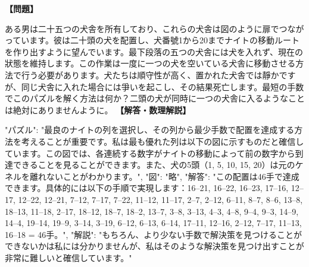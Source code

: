 \documentclass[10pt,a4paper,oneside,openany]{ltjsbook}
\begin{document}
\begin{tcolorbox}[colback=softblue,colframe=primaryblue,title=\textbf{第 344 問：THE KENNEL PUZZLE.},arc=2mm,boxrule=1pt,breakable]
\textbf{【問題】}\par\vspace{0.3em}

ある男は二十五つの犬舎を所有しており、これらの犬舎は図のように扉でつながっています。彼は二十頭の犬を配置し、犬番號1から20までナイトの移動ルートを作り出すように望んでいます。最下段落の五つの犬舎には犬を入れず、現在の狀態を維持します。この作業は一度に一つの犬を空いている犬舎に移動させる方法で行う必要があります。犬たちは順守性が高く、置かれた犬舎では靜かですが、同じ犬舎に入れた場合には爭いを起こし、その結果死亡します。最短の手数でこのパズルを解く方法は何か？二頭の犬が同時に一つの犬舎に入るようなことは絶対にありませんように。
\tcblower
\textbf{【解答・数理解説】}\par\vspace{0.3em}
{
    "パズル": "最良のナイトの列を選択し、その列から最少手数で配置を達成する方法を考えることが重要です。私は最も優れた列は以下の図に示すものだと確信しています。この図では、各連続する数字がナイトの移動によって前の数字から到達できることを見ることができます。また、犬の5頭（1, 5, 10, 15, 20）は元のケネルを離れないことがわかります。",
    "図": "略",
    "解答": "この配置は46手で達成できます。具体的には以下の手順で実現します：16--21, 16--22, 16--23, 17--16, 12--17, 12--22, 12--21, 7--12, 7--17, 7--22, 11--12, 11--17, 2--7, 2--12, 6--11, 8--7, 8--6, 13--8, 18--13, 11--18, 2--17, 18--12, 18--7, 18--2, 13--7, 3--8, 3--13, 4--3, 4--8, 9--4, 9--3, 14--9, 14--4, 19--14, 19--9, 3--14, 3--19, 6--12, 6--13, 6--14, 17--11, 12--16, 2--12, 7--17, 11--13, 16--18 = 46手。",
    "解説": "もちろん、より少ない手数で解決策を見つけることができないかは私には分かりませんが、私はそのような解決策を見つけ出すことが非常に難しいと確信しています。"
}
\end{tcolorbox}
\end{document}
